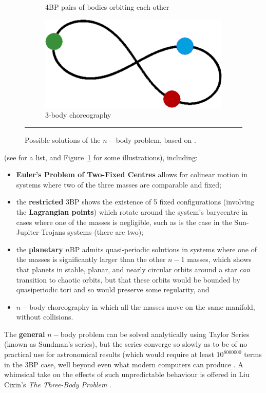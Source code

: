 \begin{figure}[!t]
\begin{subfigure}[m]{0.3\textwidth}
\caption{\small 4BP pairs of bodies orbiting each other}
\end{subfigure}\quad 
\begin{subfigure}[m]{0.3\textwidth}
\includegraphics[width=\textwidth]{images/SIM/nbp3.png}
\caption{\small 3-body choreography}
\end{subfigure}
\caption[\small Possible solutions of the $n-$body problem]{\small Possible solutions of the $n-$body problem, based on \cite{SIM_WUM}.}\label{fig:nbp}\hrule\end{figure}(see \cite{SIM_NBP} for a list, and Figure~\ref{fig:nbp} for some illustrations), including: 
\begin{itemize}[noitemsep]
\item \textbf{Euler's Problem of Two-Fixed Centres} allows for colinear motion in systems where two of the three masses are comparable and fixed;
\item the \textbf{restricted} 3BP shows the existence of 5 fixed configurations (involving the \textbf{Lagrangian points}) which rotate around the system's  barycentre in cases where one of the masses is negligible, such as is the case in the Sun-Jupiter-Trojans systems (there are two);
\item the \textbf{planetary} $n$BP admits quasi-periodic solutions in systems where one of the masses is significantly larger than the other $n-1$ masses, which shows that planets in stable, planar, and nearly circular orbits around a star \textit{can} transition to chaotic orbits, but that these orbits would be bounded by quasiperiodic tori and so would preserve some regularity, and
\item \textbf{$n-$}body choreography in which all the masses move on the same manifold, without collisions. 
\end{itemize}  
The \textbf{general} $n-$body problem can be solved analytically using Taylor Series (known as Sundman's series), but the series converge so slowly as to be of no practical use for astronomical results (which would require at least $10^{8000000}$ terms in the 3BP case, well beyond even what modern computers can produce \cite{SIM_B}. A whimsical take on the effects of such unpredictable behaviour is offered in Liu Cixin's  \textit{The Three-Body Problem} \cite{SIM_LC}. 
